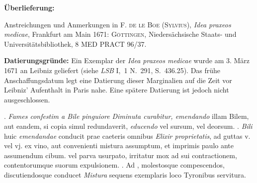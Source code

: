 \begin{ledgroupsized}[r]{120mm}%
\footnotesize%
\pstart%
\noindent%
\textbf{\"{U}berlieferung:}%
\pend%
\end{ledgroupsized}%
\begin{ledgroupsized}[r]{114mm}%
\footnotesize%
\pstart%
\parindent -6mm%
%
Anstreichungen und Anmerkungen in
\cite{01148}\textsc{F. de le Boe (Sylvius)}, \textit{Idea praxeos medicae}, Frank\-furt am Main 1671:
\textsc{G\"{o}ttingen}, Nieders\"{a}chsische Staats- und Universit\"{a}tsbibliothek, 8 MED PRACT 96/37.
\pend%
\end{ledgroupsized}%
%
\vspace*{5mm}%
\begin{ledgroup}%
\footnotesize%
\pstart%
\noindent%
\footnotesize{%
\textbf{Datierungsgr\"{u}nde:}
Ein Exemplar der \textit{Idea praxeos medicae} wurde am 3. M\"{a}rz 1671 an Leibniz geliefert (siehe \textit{LSB} I,~1 N.~291, S.~436.25).
Das fr\"{u}he Anschaffungsdatum
legt eine Datierung dieser Marginalien auf die Zeit vor Leibniz' Aufenthalt in Paris nahe.
Eine spätere Datierung ist jedoch nicht ausgeschlossen.%
}%
\pend%
\end{ledgroup}%
%
%
\vspace*{8mm}%
\count{}
\count{}
\count{}
\pstart%
\normalsize%
. \textit{Fames confestim a Bile pinguiore} \textit{Diminuta curabitur, emendando} illam Bilem, aut eandem, si copia simul redundaverit, \textit{educendo} vel sursum, vel deorsum.
\pend%
. \textit{Bili} huic \textit{emendandae} conducit prae caeteris omnibus \textit{Elixir proprietatis}, ad guttas v. vel vj. ex vino, aut convenienti mistura assumptum, et imprimis paulo ante assumendum cibum.
\pend%
\pstart%
[p. 59] [...] vel parva usurpato, irritatur mox ad sui contractionem, contentorumque suorum expulsionem.
\pend%
. Ad , molestosque compescendos, discutiendosque conducet \textit{Mistura} sequens exemplaris loco Tyronibus servitura.
